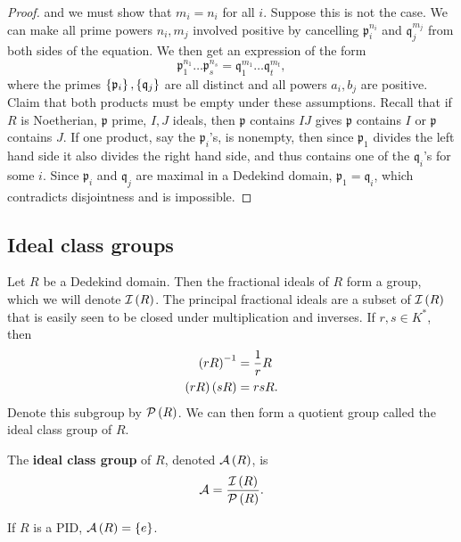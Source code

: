 \begin{proof}
and we must show that $ m_i = n_i $ for all $ i $. Suppose this is not the case. We can make all prime powers $ n_i, m_j $ involved positive by cancelling $ \mathfrak{p}_i^{n_i} $ and $ \mathfrak{q}_j^{m_j} $ from both sides of the equation. We then get an expression of the form
$$ \mathfrak{p}_1^{n_1} \dots \mathfrak{p}_s^{n_s} = \mathfrak{q}_1^{m_1} \dots \mathfrak{q}_t^{m_t}, $$
where the primes $ \left\{ \mathfrak{p}_i \right\}, \left\{ \mathfrak{q}_j \right\} $ are all distinct and all powers $ a_i, b_j $ are positive. Claim that both products must be empty under these assumptions. Recall that if $ R $ is Noetherian, $ \mathfrak{p} $ prime, $ I, J $ ideals, then $ \mathfrak{p} $ contains $ IJ $ gives $ \mathfrak{p} $ contains $ I $ or $ \mathfrak{p} $ contains $ J $. If one product, say the $ \mathfrak{p}_i $'s, is nonempty, then since $ \mathfrak{p}_1 $ divides the left hand side it also divides the right hand side, and thus contains one of the $ \mathfrak{q}_i $'s for some $ i $. Since $ \mathfrak{p}_i $ and $ \mathfrak{q}_j $ are maximal in a Dedekind domain, $ \mathfrak{p}_1 = \mathfrak{q}_i $, which contradicts disjointness and is impossible.
\end{proof}

\subsection{Ideal class groups}

Let $ R $ be a Dedekind domain. Then the fractional ideals of $ R $ form a group, which we will denote $ \mathcal{I}\left( R \right) $. The principal fractional ideals are a subset of $ \mathcal{I}\left( R \right) $ that is easily seen to be closed under multiplication and inverses. If $ r, s \in K^* $, then
\begin{align*}
\left( rR \right)^{-1} & = \dfrac{1}{r}R \\
\left( rR \right)\left( sR \right) & = rsR.
\end{align*}
Denote this subgroup by $ \mathcal{P}\left( R \right) $. We can then form a quotient group called the ideal class group of $ R $.

\begin{definition}
The \textbf{ideal class group} of $ R $, denoted $ \mathcal{A}\left( R \right) $, is
$$ \mathcal{A} = \dfrac{\mathcal{I}\left( R \right)}{\mathcal{P}\left( R \right)}. $$
\end{definition}

\begin{example2}
If $ R $ is a PID, $ \mathcal{A}\left( R \right) = \left\{ e \right\} $.
\end{example2}

